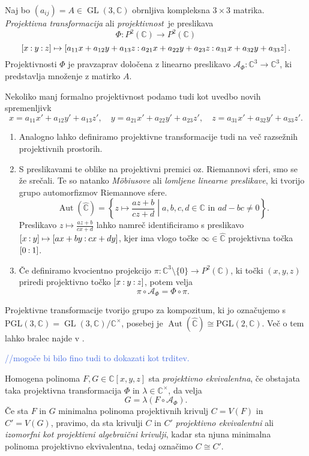 \documentclass[mat1]{fmfdelo}
\newcommand{\C}{\mathbb C}
\newcommand{\CM}{\mathbb C ^\times}
\newcommand{\PC}{P^2(\mathbb C)}
\newcommand{\RS}{\widehat{\C}}
\newcommand{\Cxyz}{\C[x,y,z]}
\newcommand{\pcoor}[1]{%
\begingroup\lccode`~=`: \lowercase{\endgroup
\edef~}{\mathbin{\mathchar\the\mathcode`:}\nobreak}%
\left[%
\begingroup
\mathcode`:=\string"8000
#1%
\endgroup
\right]%
}
\newcommand{\kom}[1]{
    \textcolor{RoyalBlue}{//#1}
}
\DeclareMathOperator{\GL}{GL}
\DeclareMathOperator{\Aut}{Aut}
\theoremstyle{definition}
\begin{document}
\begin{definicija}
    Naj bo $(a_{ij}) = A \in \GL(3, \C)$ obrnljiva kompleksna $3 \times 3$ matrika. \emph{Projektivna transformacija} ali \emph{projektivnost} je preslikava
        $$\Phi : \PC \to \PC$$
        $$\pcoor{x:y:z} \mapsto \pcoor{a_{11}x + a_{12}y + a_{13}z: a_{21}x + a_{22}y + a_{23}z: a_{31}x + a_{32}y + a_{33}z}.$$
    Projektivnosti $\Phi$ je pravzaprav določena z linearno preslikavo $\mathcal{A}_{\Phi} : \C^3 \to \C^3$, ki predstavlja množenje z matirko $A$.

    Nekoliko manj formalno projektivnost podamo tudi kot uvedbo novih spremenljivk 
    \[
        x = a_{11}x' + a_{12}y' + a_{13}z', \quad y = a_{21}x' + a_{22}y' + a_{23}z', \quad z = a_{31}x' + a_{32}y' + a_{33}z'.  
    \]
\end{definicija}

\begin{opomba}
    \begin{enumerate}
        \item Analogno lahko definiramo projektivne transformacije tudi na več razsežnih projektivnih prostorih. 
        \item
        S preslikavami te oblike na projektivni premici oz. Riemannovi sferi, smo se že srečali. Te so natanko \emph{Möbiusove} ali \emph{lomljene linearne preslikave}, ki tvorijo grupo automorfizmov Riemannove sfere.
        $$\Aut(\RS) = \left\{ z \mapsto \frac{az + b}{cz +d} \middle\vert a,b,c,d \in \C \text{ in }  ad - bc \neq 0 \right\}.$$
        Preslikavo $z \mapsto \tfrac{az + b}{cx +d}$ lahko namreč identificiramo s preslikavo $\pcoor{x:y} \mapsto \pcoor{ax + by: cx + dy}$, kjer ima vlogo točke $\infty \in \RS$ projektivna točka $\pcoor{0:1}$. 
        \item
        Če definiramo kvocientno projekcijo $\pi : \C^3 \setminus \{0\} \to \PC$, ki točki $(x,y,z)$ priredi projektivno točko $\pcoor{x:y:z}$, potem velja 
        $$\pi \circ \mathcal{A}_\Phi = \Phi \circ \pi.$$
    \end{enumerate}
\end{opomba}

Projektivne transformacije tvorijo grupo za kompozitum, ki jo označujemo s $\operatorname{PGL(3, \C)} = \GL(3,\C)/\CM$, posebej je $\Aut(\RS) \cong \operatorname{PGL(2,\C)}$. Več o tem lahko bralec najde v \cite[poglavje 11]{Gibson}.
\kom{mogoče bi bilo fino tudi to dokazati kot trditev.}

\begin{definicija}
    Homogena polinoma $F,G \in \Cxyz$ sta \emph{projektivno ekvivalentna}, če obstajata taka projektivna transformacija $\Phi$ in $\lambda \in \CM$, da velja
    $$ G = \lambda (F \circ \mathcal{A}_\Phi). $$
    Če sta $F$ in $G$ minimalna polinoma projektivnih krivulj $C = V(F)$ in $C' = V(G)$, pravimo, da sta krivulji $C$ in $C'$ \emph{projektivno ekvivalentni} ali \emph{izomorfni kot projektivni algebraični krivulji}, kadar sta njuna minimalna polinoma projektivno ekvivalentna, tedaj označimo $C \cong C'$. 
\end{definicija}
\end{document}
